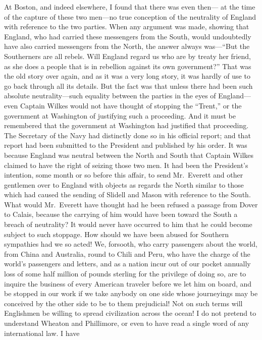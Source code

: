 At Boston, and indeed elsewhere, I found that there was even then---%
at the time of the capture of these two men---no true conception of
the neutrality of England with reference to the two parties.  When
any argument was made, showing that England, who had carried these
messengers from the South, would undoubtedly have also carried
messengers from the North, the answer always was---``But the
Southerners are all rebels.  Will England regard us who are by
treaty her friend, as she does a people that is in rebellion
against its own government?''  That was the old story over again,
and as it was a very long story, it was hardly of use to go back
through all its details.  But the fact was that unless there had
been such absolute neutrality---such equality between the parties in
the eyes of England---even Captain Wilkes would not have thought of
stopping the ``Trent,'' or the government at Washington of justifying
such a proceeding.  And it must be remembered that the government
at Washington had justified that proceeding.  The Secretary of the
Navy had distinctly done so in his official report; and that report
had been submitted to the President and published by his order.  It
was because England was neutral between the North and South that
Captain Wilkes claimed to have the right of seizing those two men.
It had been the President's intention, some month or so before this
affair, to send Mr.\ Everett and other gentlemen over to England
with objects as regards the North similar to those which had caused
the sending of Slidell and Mason with reference to the South.  What
would Mr.\ Everett have thought had he been refused a passage from
Dover to Calais, because the carrying of him would have been toward
the South a breach of neutrality?  It would never have occurred to
him that he could become subject to such stoppage.  How should we
have been abused for Southern sympathies had we so acted!  We,
forsooth, who carry passengers about the world, from China and
Australia, round to Chili and Peru, who have the charge of the
world's passengers and letters, and as a nation incur out of our
pocket annually loss of some half million of pounds sterling for
the privilege of doing so, are to inquire the business of every
American traveler before we let him on board, and be stopped in our
work if we take anybody on one side whose journeyings may be
conceived by the other side to be to them prejudicial!  Not on such
terms will Englishmen be willing to spread civilization across the
ocean!  I do not pretend to understand Wheaton and Phillimore, or
even to have read a single word of any international law.  I have
